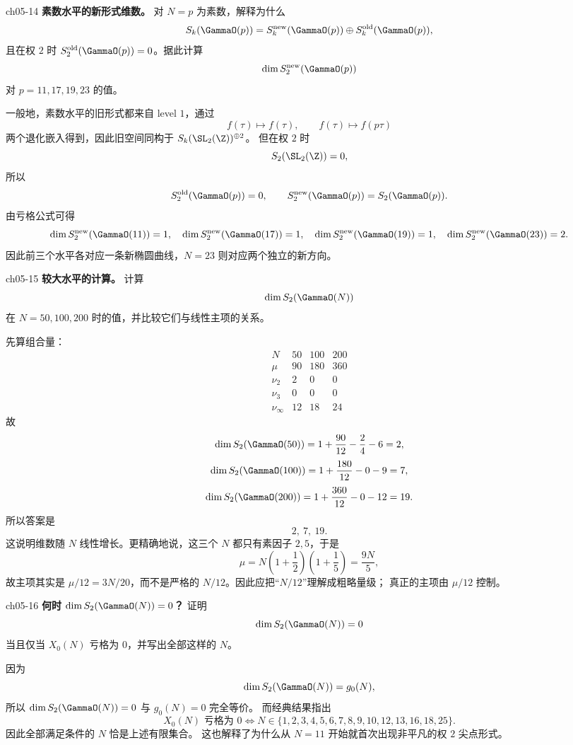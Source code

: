\begin{problem}{ch05-14}
\textbf{素数水平的新形式维数。}
对 $N=p$ 为素数，解释为什么
\[
S_k(\GammaO(p))=S_k^{\mathrm{new}}(\GammaO(p))\oplus S_k^{\mathrm{old}}(\GammaO(p)),
\]
且在权 $2$ 时 $S_2^{\mathrm{old}}(\GammaO(p))=0$。据此计算
\[
\dim S_2^{\mathrm{new}}(\GammaO(p))
\]
对 $p=11,17,19,23$ 的值。
\end{problem}
\begin{solution}
一般地，素数水平的旧形式都来自 level $1$，通过
\[
f(\tau)\mapsto f(\tau),\qquad f(\tau)\mapsto f(p\tau)
\]
两个退化嵌入得到，因此旧空间同构于 $S_k(\SL_2(\Z))^{\oplus 2}$。
但在权 $2$ 时
\[
S_2(\SL_2(\Z))=0,
\]
所以
\[
S_2^{\mathrm{old}}(\GammaO(p))=0,
\qquad
S_2^{\mathrm{new}}(\GammaO(p))=S_2(\GammaO(p)).
\]
由亏格公式可得
\[
\dim S_2^{\mathrm{new}}(\GammaO(11))=1,
\quad
\dim S_2^{\mathrm{new}}(\GammaO(17))=1,
\quad
\dim S_2^{\mathrm{new}}(\GammaO(19))=1,
\quad
\dim S_2^{\mathrm{new}}(\GammaO(23))=2.
\]
因此前三个水平各对应一条新椭圆曲线，$N=23$ 则对应两个独立的新方向。
\end{solution}

\begin{problem}{ch05-15}
\textbf{较大水平的计算。}
计算
\[
\dim S_2(\GammaO(N))
\]
在 $N=50,100,200$ 时的值，并比较它们与线性主项的关系。
\end{problem}
\begin{solution}
先算组合量：
\[
\begin{array}{c|ccc}
N & 50 & 100 & 200 \\ \hline
\mu & 90 & 180 & 360 \\
\nu_2 & 2 & 0 & 0 \\
\nu_3 & 0 & 0 & 0 \\
\nu_\infty & 12 & 18 & 24
\end{array}
\]
故
\[
\dim S_2(\GammaO(50))=1+\frac{90}{12}-\frac24-6=2,
\]
\[
\dim S_2(\GammaO(100))=1+\frac{180}{12}-0-9=7,
\]
\[
\dim S_2(\GammaO(200))=1+\frac{360}{12}-0-12=19.
\]
所以答案是
\[
2,\ 7,\ 19.
\]
这说明维数随 $N$ 线性增长。更精确地说，这三个 $N$ 都只有素因子 $2,5$，于是
\[
\mu=N\left(1+\frac12\right)\left(1+\frac15\right)=\frac{9N}{5},
\]
故主项其实是 $\mu/12=3N/20$，而不是严格的 $N/12$。因此应把“$N/12$”理解成粗略量级；
真正的主项由 $\mu/12$ 控制。
\end{solution}

\begin{problem}{ch05-16}
\textbf{何时 $\dim S_2(\GammaO(N))=0$？}
证明
\[
\dim S_2(\GammaO(N))=0
\]
当且仅当 $X_0(N)$ 亏格为 $0$，并写出全部这样的 $N$。
\end{problem}
\begin{solution}
因为
\[
\dim S_2(\GammaO(N))=g_0(N),
\]
所以 $\dim S_2(\GammaO(N))=0$ 与 $g_0(N)=0$ 完全等价。
而经典结果指出
\[
X_0(N)\text{ 亏格为 }0
\iff
N\in\{1,2,3,4,5,6,7,8,9,10,12,13,16,18,25\}.
\]
因此全部满足条件的 $N$ 恰是上述有限集合。
这也解释了为什么从 $N=11$ 开始就首次出现非平凡的权 $2$ 尖点形式。
\end{solution}

